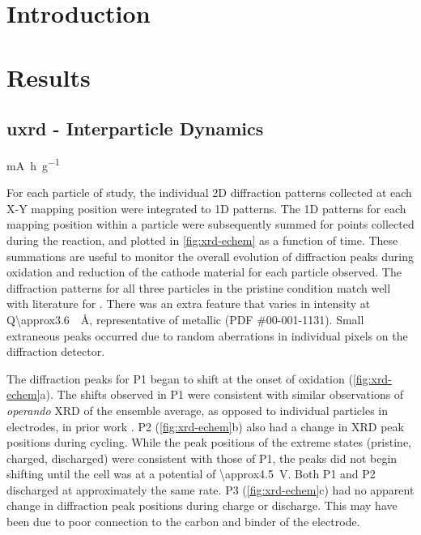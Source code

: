 \documentclass{article}
\begin{document}
\maketitle

\section{Introduction}

\section{Results}

\subsection{\Gls{uxrd} - Interparticle Dynamics}

\si{\milli\ampere\hour\per\gram}

For each particle of study, the individual 2D diffraction patterns
collected at each X-Y mapping position were integrated to 1D
patterns. The 1D patterns for each mapping position within a particle
were subsequently summed for points collected during the reaction, and
plotted in \ref{fig:xrd-echem} as a function of time. These summations
are useful to monitor the overall evolution of diffraction peaks
during oxidation and reduction of the cathode material for each
particle observed. The diffraction patterns for all three particles in
the pristine condition match well with literature for \nca{}
\cite{Robert2015a}. There was an extra feature that varies in
intensity at Q\SI{\approx3.6}{\per\angstrom}, representative of
metallic  (PDF \#00-001-1131). Small extraneous peaks occurred
due to random aberrations in individual pixels on the diffraction
detector.

The diffraction peaks for P1 began to shift at the onset of oxidation
(\ref{fig:xrd-echem}a). The shifts observed in P1 were consistent with
similar observations of \emph{operando} XRD of the ensemble average,
as opposed to individual particles in \nca{} electrodes, in prior work
\cite{Robert2015, Grenier2017}. P2 (\ref{fig:xrd-echem}b) also had a
change in XRD peak positions during cycling. While the peak positions
of the extreme states (pristine, charged, discharged) were consistent
with those of P1, the peaks did not begin shifting until the cell was
at a potential of \SI{\approx4.5}{\volt}. Both P1 and P2 discharged at
approximately the same rate. P3 (\ref{fig:xrd-echem}c) had no apparent
change in diffraction peak positions during charge or discharge. This
may have been due to poor connection to the carbon and binder of the
electrode.
\end{document}
